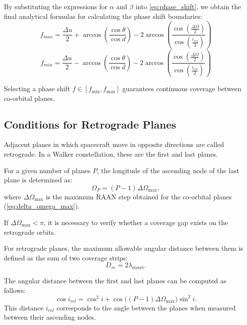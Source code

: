 By substituting the expressions for \(\alpha\) and \(\beta\) into \eqref{eq:phase_shift}, we obtain
the final analytical formulas for calculating the phase shift boundaries:
\begin{equation}
    f_{max} = \frac{\Delta u}{2} + \arccos \left( \frac{\cos \theta}{\cos d} \right)
    - 2 \arccos \left( \frac{\cos\left(\frac{\Delta\Omega}{2}\right)}{\cos\left(
        \frac{i_{rel}}{2}\right)} \right)
\end{equation}
\begin{equation}
    f_{min} = \frac{\Delta u}{2} - \arccos \left( \frac{\cos \theta}{\cos d} \right)
    - 2 \arccos \left( \frac{\cos\left(\frac{\Delta\Omega}{2}\right)}{\cos\left(
        \frac{i_{rel}}{2}\right)} \right)
\end{equation}

Selecting a phase shift \(f \in [f_{\min}, f_{\max}]\) guarantees continuous coverage between
co-orbital planes.


\subsection{Conditions for Retrograde Planes}

Adjacent planes in which spacecraft move in opposite directions are called retrograde. In a Walker
constellation, these are the first and last planes.

For a given number of planes \(P\), the longitude of the ascending node of the last plane is
determined as:
\begin{equation}
    \Omega_P = (P-1)\Delta\Omega_{\text{max}},
\end{equation}
where \(\Delta\Omega_{\text{max}}\) is the maximum RAAN step obtained for the co-orbital planes
(\ref{eq:delta_omega_max}).

If \(\Delta\Omega_{\text{max}} < \pi\), it is necessary to verify whether a coverage gap exists on
the retrograde orbits.

For retrograde planes, the maximum allowable angular distance between them is defined as the sum of
two coverage strips:
\begin{equation}
    D_{re} = 2\lambda_{\text{street}}.
\end{equation}

The angular distance between the first and last planes can be computed as follows:
\begin{equation}
    \cos i_{rel} = \cos^2 i + \cos\bigl((P-1)\Delta\Omega_{\text{max}}\bigr)\sin^2 i.
\end{equation}
This distance \(i_{rel}\) corresponds to the angle between the planes when measured between their
ascending nodes.

